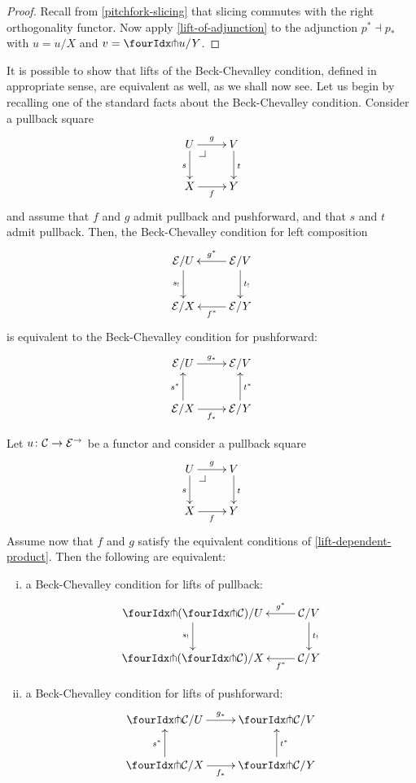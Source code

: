 \documentclass[reqno,10pt,a4paper,oneside]{amsart}
\begin{document}
\begin{proof}
Recall from \cref{pitchfork-slicing} that slicing commutes with the right orthogonality functor.
Now apply \cref{lift-of-adjunction} to the adjunction $p^* \dashv p_*$ with $u = u/X$ and $v = \liftr{u}/Y$.
\end{proof}

It is possible to show that lifts of the Beck-Chevalley condition, defined in appropriate sense, are equivalent as well, as we shall now see. Let us begin by recalling one of the standard facts about the Beck-Chevalley condition. Consider a
pullback square 
\[
\xymatrix{
  U
  \ar[d]_{s}
  \ar[r]^{g}
  \pullback{dr}
&
  V
  \ar[d]^{t}
\\
  X
  \ar[r]_{f}
&
  Y
}
\]
and assume that $f$ and $g$ admit pullback and pushforward, and that $s$ and $t$ admit pullback. Then,
 the Beck-Chevalley condition for left composition
\[
\xymatrix{
  \catE/U
  \ar[d]_{s_!}
&
  \catE/V
  \ar[l]_{g^*}
  \ar[d]^{t_!}
\\
  \catE/X
&
  \catE/Y
  \ar[l]^{f^*}
}
\]
is equivalent to the Beck-Chevalley condition for pushforward:
\[
\xymatrix{
  \catE/U
  \ar[r]^{g_*}
&
  \catE/V
\\
  \catE/X
  \ar[r]_{f_*}
  \ar[u]^{s^*}
&
  \catE/Y
  \ar[u]_{t^*}
}
\]





\begin{proposition}
\label{lift-pushforward-BC} Let $u \colon \mathcal{C} \to \mathcal{E}^{\to}$ be a functor and consider a 
pullback square
\[
\xymatrix{
  U
  \ar[d]_{s}
  \ar[r]^{g}
  \pullback{dr}
&
  V
  \ar[d]^{t}
\\
  X
  \ar[r]_{f}
&
  Y
}
\]
Assume now that $f$ and $g$ satisfy the equivalent conditions of \cref{lift-dependent-product}.
Then the following are equivalent:
\begin{enumerate}[(i)]
\item a Beck-Chevalley condition for lifts of pullback:
\[
\xymatrix{
  \liftl{(\liftr{\cal{C}})}/U
  \ar[d]_{s_!}
&
  \cal{C}/V
  \ar[l]_-{g^*}
  \ar[d]^{t_!}
\\
  \liftl{(\liftr{\cal{C}})}/X
&
  \cal{C}/Y
  \ar[l]^-{f^*}
}
\]
\item a Beck-Chevalley  condition for lifts of pushforward:
\[
\xymatrix{
  \liftr{\cal{C}}/U
  \ar[r]^{g_*}
&
  \liftr{\cal{C}}/V
\\
  \liftr{\cal{C}}/X
  \ar[r]_{f_*}
  \ar[u]^{s^*}
&
  \liftr{\cal{C}}/Y
  \ar[u]_{t^*}
}
\]

\end{enumerate}
\end{proposition}
\end{document}

